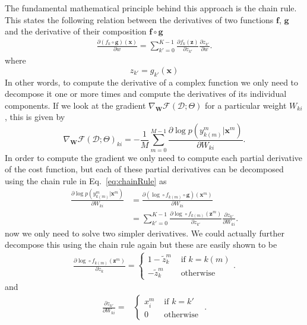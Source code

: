 The fundamental mathematical principle behind this approach is the chain rule.
This states the following relation between the derivatives of two functions
$\mathbf{f}$, $\mathbf{g}$ and the derivative of their composition $\mathbf{f}
\circ \mathbf{g}$
%
\begin{align}
\frac{\partial (f_{k} \circ \mathbf{g})(\mathbf{x}) }{\partial w} = \sum_{k'=0}^{K-1}\frac{\partial f_{k}(\mathbf{z})}{\partial z_{k'}}\frac{\partial z_{k'}}{\partial w}.
\label{eq:chainRule}
\end{align}
%
\noindent where 
%
\begin{equation}
z_{k'} = g_{k'}(\mathbf{x})
\end{equation}
%
In other words, to compute the derivative of a complex function we only need
to decompose it one or more times and compute the derivatives of its individual
components. If we look at the gradient
$\nabla_\mathbf{W}\mathcal{F}(\mathcal{D};\Theta)$ for a particular weight
$W_{ki}$, this is given by
%
\begin{equation}
\nabla_\mathbf{W}\mathcal{F}(\mathcal{D};\Theta)_{ki} =-\frac{1}{M}\sum_{m=0}^{M-1} \frac{\partial \log p(y^m_{k(m)} | \mathbf{x}^m) }{\partial W_{ki}}.
\label{eq:gradlogPycx}
\end{equation}
%
In order to compute the gradient we only need to compute each partial
derivative of the cost function, but each of these partial derivatives can be
decomposed using the chain rule in Eq.~\ref{eq:chainRule} as
%
\begin{align}
\frac{\partial \log p(y^m_{k(m)} | \mathbf{x}^m) }{\partial W_{ki}} & = \frac{\partial (\log \circ f_{k(m)} \circ \mathbf{g})(\mathbf{x}^m) }{\partial W_{ki}}\nonumber\\ & = \sum_{k'=0}^{K-1}\frac{\partial \log \circ f_{k(m)}(\mathbf{z}^m)}{\partial z_{k'}}\frac{\partial z_{k'}}{\partial W_{ki}}.
\end{align}
%
now we only need to solve two simpler derivatives. We could actually further
decompose this using the chain rule again but these are easily shown to be
%
\begin{align}
\frac{\partial \log \circ f_{k(m)}(\mathbf{z}^m)}{\partial z_{k}} = 
  \begin{cases}
      1 - \tilde{z}_k^m  &  \mbox{ if } k = k(m)\\ 
      -\tilde{z}_k^m    &  \mbox{ otherwise } 
  \end{cases}. 
  \label{eq:patialSoftmax}
\end{align}
%
\noindent and
\begin{align}
\frac{\partial z_{k'}}{\partial W_{ki}} = 
  &\begin{cases}
      x_i^m  &  \mbox{ if } k = k'\\ 
      0    &  \mbox{ otherwise } 
  \end{cases}.
  \label{eq:partialLinear}
\end{align}

